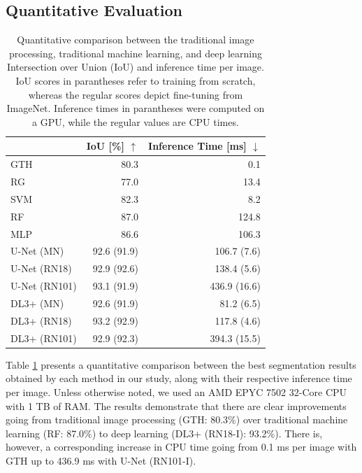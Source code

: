 \documentclass{isprs} %
\begin{document}
\subsection{Quantitative Evaluation}
\setlength{\extrarowheight}{3pt}
\begin{table}
\begin{center}
\begin{tabular}{lrr}
& IoU [\%] $\uparrow$ & Inference Time [ms] $\downarrow$\\ \hline 
GTH & 80.3 & 0.1 \\
RG & 77.0 & 13.4 \\ \hdashline
SVM & 82.3 & 8.2 \\
RF & 87.0 & 124.8 \\
MLP & 86.6 & 106.3 \\ \hdashline
U-Net (MN) & 92.6 (91.9) & 106.7 (7.6) \\
U-Net (RN18) & 92.9 (92.6) & 138.4 (5.6) \\
U-Net (RN101) & 93.1 (91.9) & 436.9 (16.6) \\
DL3+ (MN) & 92.6 (91.9) & 81.2 (6.5) \\
DL3+ (RN18) & 93.2 (92.9) & 117.8 (4.6) \\
DL3+ (RN101) & 92.9 (92.3) & 394.3 (15.5) \\
\end{tabular}
\end{center}
\caption{Quantitative comparison between the traditional image processing, traditional machine learning, and deep learning Intersection over Union (IoU) and inference time per image. IoU scores in parantheses refer to training from scratch, whereas the regular scores depict fine-tuning from ImageNet. Inference times in parantheses were computed on a GPU, while the regular values are CPU times.}
\label{quantitative_comparison}
\end{table}

Table \ref{quantitative_comparison} presents a quantitative comparison between the best segmentation results obtained by each method in our study, along with their respective inference time per image. Unless otherwise noted, we used an AMD EPYC 7502 32-Core CPU with 1 TB of RAM. The results demonstrate that there are clear improvements going from traditional image processing (GTH: 80.3\%) over traditional machine learning (RF: 87.0\%) to deep learning (DL3+ (RN18-I): 93.2\%). There is, however, a corresponding increase in CPU time going from 0.1 ms per image with GTH up to 436.9 ms with U-Net (RN101-I). 
\end{document}
